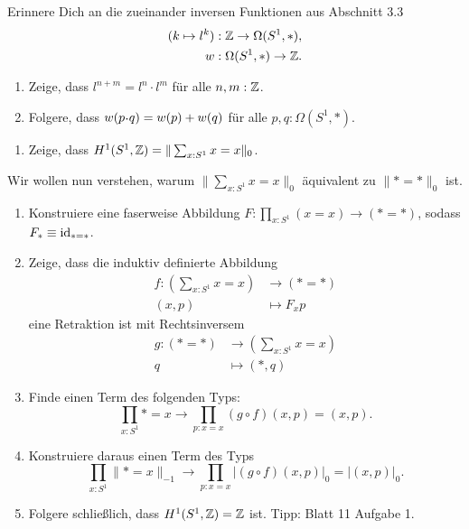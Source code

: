 \documentclass{uebung}
\begin{document}

\begin{exercise}
  Erinnere Dich an die zueinander inversen Funktionen aus Abschnitt 3.3
  \begin{align*}
    (k\mapsto l^k) &: \mathbb{Z} \to \Omega(S^1,\ast),\\
    w&:\Omega(S^1,\ast) \to \mathbb{Z}.
  \end{align*}
  \begin{enumerate}
    \item Zeige, dass $l^{n + m} = l^n \cdot l^m$ für alle $n,m:\mathbb{Z}$.
    \item Folgere, dass $w(p\kon q)=w(p)+w(q)$ für alle $p,q:\Omega(S^1,\ast)$.
  \end{enumerate}
\end{exercise}

\begin{exercise}
  \begin{enumerate}
    \item Zeige, dass $H^1(S^1,\mathbb{Z}) = \|\sum_{x:S^1} x=x\|_0$.
  \end{enumerate}
  Wir wollen nun verstehen, warum $\|\sum_{x:S^1} x=x\|_0$ äquivalent zu $\|\ast = \ast\|_0$ ist.
  \begin{enumerate}[start=2]
    \item Konstruiere eine faserweise Abbildung $F:\prod_{x:S^1} (x = x) \to (\ast = \ast)$, sodass $F_\ast\equiv\mathrm{id}_{\ast = \ast}$.
    \item Zeige, dass die induktiv definierte Abbildung
      \begin{align*}
        f:\left(\sum_{x:S^1} x=x\right) &\to (\ast=\ast)\\
        (x,p)&\mapsto F_xp
      \end{align*}
      eine Retraktion ist mit Rechtsinversem
      \begin{align*}
        g:(\ast=\ast) &\to \left(\sum_{x:S^1} x=x\right)\\
        q &\mapsto (\ast,q)
      \end{align*}
    \item Finde einen Term des folgenden Typs:
      $$
      \prod_{x:S^1} \ast=x \to \prod_{p:x=x} (g\circ f)(x,p) = (x,p).
      $$
    \item Konstruiere daraus einen Term des Typs
      $$
      \prod_{x:S^1} \|\ast=x\|_{-1} \to \prod_{p:x=x} |(g\circ f)(x,p)|_0 = |(x,p)|_0.
      $$
    \item Folgere schließlich, dass $H^1(S^1,\mathbb{Z}) = \mathbb{Z}$ ist.
      {\tiny Tipp: Blatt 11 Aufgabe 1.}
  \end{enumerate}
\end{exercise}
\end{document}
